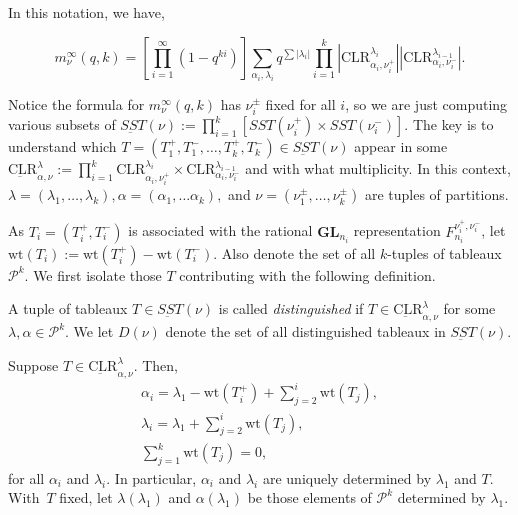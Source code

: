 \documentclass[ALCO,Unicode]{cedram}
\newcommand{\GL}{\textbf{GL}}
\newcommand{\Par}{\mathcal{P}}
\newcommand{\wt}{\text{wt}}
\newcommand{\CLR}{\text{CLR}}
\begin{document}
In this notation, we have,

$$m_\nu^\infty(q,k) = [\prod_{i=1}^\infty(1-q^{ki})]\sum_{\alpha_i, \lambda_i} q^{\sum |\lambda_i|}\prod_{i=1}^k
    |\CLR^{\lambda_i}_{\alpha_i, \nu_i^+}| |\CLR^{\lambda_{i-1}}_{\alpha_i, \nu_i^-}|.$$

    
Notice the formula for $m_\nu^\infty(q,k)$ has $\nu_i^\pm$ fixed for all $i$, so we are just computing various subsets of $\underbar{SST}(\nu) := \prod_{i=1}^k [SST(\nu_i^+) \times SST(\nu_i^-)]$. The key is to understand which $T = (T_1^+,T_1^-, \dots , T_k^+, T_k^-)\in \underbar{SST}(\nu)$ appear in some $\underbar{\CLR}^\lambda_{\alpha, \nu} := \prod_{i=1}^k \CLR^{\lambda_i}_{\alpha_i, \nu_i^+} \times \CLR^{\lambda_{i-1}}_{\alpha_i, \nu_i^-}$ and with what multiplicity. In this context, $\lambda = (\lambda_1, \dots , \lambda_k), \alpha = (\alpha_1, \dots \alpha_k),$ and $\nu = (\nu_1^\pm, \dots, \nu_k^\pm)$ are tuples of partitions.

As $T_i = (T_i^+, T_i^-)$ is associated with the rational $\GL_{n_i}$ representation $F^{\nu_i^+, \nu_i^-}_{n_i}$, let $\wt(T_i) := \wt(T_i^+) - \wt(T_i^-)$. Also denote the set of all $k$-tuples of tableaux $\Par^k$. We first isolate those $T$ contributing with the following definition.

\begin{defn}
    A tuple of tableaux $T\in \underbar{SST}(\nu)$ is called \emph{distinguished} if $T \in \underbar{\CLR}^\lambda_{\alpha, \nu}$ for some $\lambda, \alpha \in \Par^k$. We let $D(\nu)$ denote the set of all distinguished tableaux in $\underbar{SST}(\nu)$.
\end{defn}

\begin{lemma} \label{lemma-alphalambda}
    Suppose $T\in \underbar{\CLR}^\lambda_{\alpha, \nu}$. Then,
    \begin{gather*}
    \alpha_i = \lambda_1 - \wt(T_i^+) + \sum_{j=2}^i \wt(T_j),\\
    \lambda_i = \lambda_1 + \sum_{j=2}^{i} \wt(T_j),\\
    \sum_{j=1}^k \wt(T_j) = 0,
    \end{gather*}
    for all $\alpha_i$ and $\lambda_i$. In particular, $\alpha_i$ and $\lambda_i$ are uniquely determined by $\lambda_1$ and $T$. With~$T$ fixed, let $\lambda(\lambda_1)$ and $\alpha(\lambda_1)$ be those elements of $\Par^k$ determined by $\lambda_1$.
\end{lemma}
\end{document}
